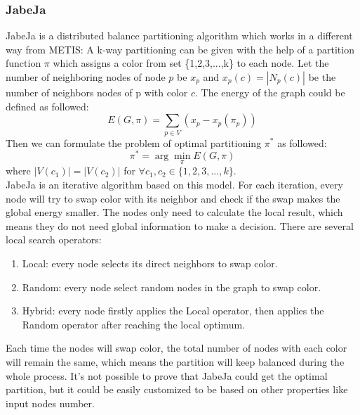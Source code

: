 \subsubsection{JabeJa}
JabeJa\cite{rahimian2013jabeja} is a distributed balance partitioning algorithm which works in a different way from METIS: A k-way partitioning can be given with the help of a partition function $\pi$ which assigns a color from set \{1,2,3,...,k\} to each node. Let the number of neighboring nodes of node $p$ be $x_p$ and $x_p(c) = |N_p(c)|$ be the number of neighbors nodes of p with color $c$. The energy of the graph could be defined as followed:
$$E(G,\pi) = \sum_{p\in V} (x_p-x_p(\pi_p))$$
Then we can formulate the problem of optimal partitioning $\pi^*$ as followed:
$$\pi^* = \arg \min_{\pi} E(G,\pi)  $$ where $|V(c_1)|=|V(c_2)| $ for $\forall c_1,c_2 \in \{1,2,3,...,k\}$.\\
JabeJa is an iterative algorithm based on this model. For each iteration, every node will try to swap color with its neighbor and check if the swap makes the global energy smaller. The nodes only need to calculate the local result, which means they do not need global information to make a decision. There are several local search operators:
\begin{enumerate}
\item Local: every node selects its direct neighbors to swap color.
\item Random: every node select random nodes in the graph to swap color.
\item Hybrid: every node firstly applies the Local operator, then applies the Random operator after reaching the local optimum.
\end{enumerate}
Each time the nodes will swap color, the total number of nodes with each color will remain the same, which means the partition will keep balanced during the whole process. It's not possible to prove that JabeJa could get the optimal partition, but it could be easily customized to be based on other properties like input nodes number.
